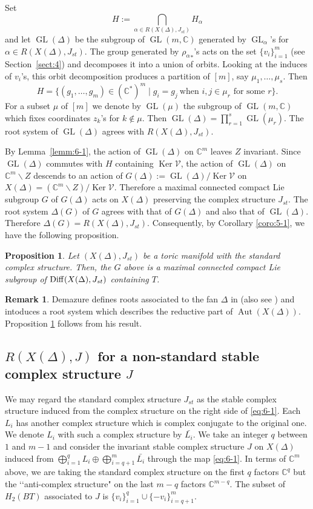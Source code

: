 \documentclass[12pt]{amsart}
\theoremstyle{plain} \numberwithin{equation}{section}
\newtheorem{prop}[theo]{Proposition}
\theoremstyle{definition}
\newtheorem{rema}[theo]{Remark}
\def\C{\mathbb C}
\def\RG{\Delta(G)}
\DeclareMathOperator{\GL}{GL}
\DeclareMathOperator{\Aut}{Aut}
\DeclareMathOperator{\Ker}{Ker}
\def\Jst{J_{st}}
\begin{document}
Set 
$$H:=\bigcap_{\alpha\in R(X(\Delta),\Jst)}H_\alpha$$ 
and let $\GL(\Delta)$ be the subgroup of $\GL(m,\C)$ generated by $\GL_\alpha$'s for $\alpha\in R(X(\Delta),\Jst)$. The group generated by ${\rho_\alpha}_*$'s acts on the set $\{v_i\}_{i=1}^m$ (see Section~\ref{sect:4}) and decomposes it into a union of orbits.  Looking at the induces of $v_i$'s, this orbit decomposition produces a partition of $[m]$, say $\mu_1,\dots,\mu_s$. Then 
\[
H=\{(g_1,\dots,g_m)\in(\C^*)^m\mid g_i=g_j \ \text{when $i,j\in\mu_r$ for some 
$r$}\}.
\]
For a subset $\mu$ of $[m]$ we denote by $\GL(\mu)$ the subgroup of $\GL(m,\C)$ which fixes coordinates $z_k$'s for $k\notin\mu$. Then $\GL(\Delta)=\prod_{r=1}^s\GL(\mu_r)$.  The root system of $\GL(\Delta)$ agrees with $R(X(\Delta),\Jst)$.  

By Lemma~\ref{lemm:6-1}, the action of $\GL(\Delta)$ on $\C^m$ leaves $Z$ invariant.  Since $\GL(\Delta)$ commutes with $H$ containing $\Ker\mathcal V$, the action of $\GL(\Delta)$ on $\C^m\backslash Z$ descends to an action of $G(\Delta):=\GL(\Delta)/\Ker \mathcal V$ on $X(\Delta)=(\C^m\backslash Z)/\Ker\mathcal V$.  Therefore a maximal connected compact Lie subgroup $G$ of $G(\Delta)$ acts on $X(\Delta)$ preserving the complex structure $\Jst$.  The root system $\RG$ of $G$ agrees with that of $G(\Delta)$ and also that of $\GL(\Delta)$. Therefore $\RG=R(X(\Delta),\Jst)$. 
Consequently, by Corollary \ref{coro:5-1}, we have the following proposition.
\begin{prop} \label{prop:6-1}
Let $(X(\Delta),\Jst)$ be a toric manifold with the standard complex structure. Then, the $G$ above is a maximal connected compact Lie subgroup of ${\rm Diff}(X(\Delta),\Jst)$ containing $T$.
\end{prop}

\begin{rema}
Demazure defines roots associated to the fan $\Delta$ in \cite{de70} (also see \cite{oda88}) and intoduces a root system which describes the reductive part of $\Aut(X(\Delta))$.  Proposition \ref{prop:6-1} follows from his result.
\end{rema}


\subsection{$R(X(\Delta),J)$ for a non-standard stable complex structure $J$} 
We may regard the standard complex structure $\Jst$ as the stable complex structure induced from the complex structure on the right side of \eqref{eq:6-1}.  Each $L_i$ has another complex structure which is complex conjugate to the original one.  We denote $L_i$ with such a complex structure by $\bar{L_i}$.  We take an integer $q$ between $1$ and $m-1$ and consider the invariant stable complex structure $J$ on $X(\Delta)$ induced from $\bigoplus_{i=1}^qL_i\oplus\bigoplus_{i=q+1}^m \bar{L_i}$ through the map \eqref{eq:6-1}. 
In terms of $\C^m$ above, we are taking the standard complex structure on the first $q$ factors $\C^q$ but the \lq\lq anti-complex structure" on the last $m-q$ factors $\C^{m-q}$.  The subset of $H_2(BT)$ associated to $J$ is $\{v_i\}_{i=1}^q\cup\{-v_i\}_{i=q+1}^m$.  
\end{document}
